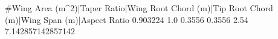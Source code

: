 #Wing Area (m^2)|Taper Ratio|Wing Root Chord (m)|Tip Root Chord (m)|Wing Span (m)|Aspect Ratio
0.903224 1.0 0.3556 0.3556 2.54 7.142857142857142
